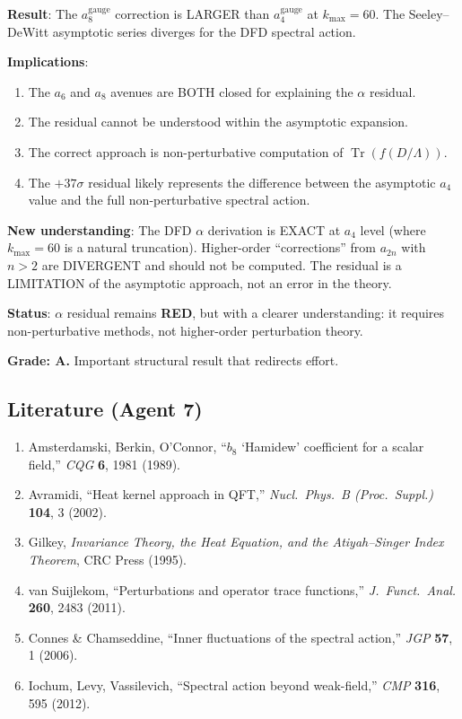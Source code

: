 \documentclass[11pt,a4paper]{article}
\newcommand{\RED}{\textcolor{dfdred}{\textbf{RED}}}
\newcommand{\Tr}{\operatorname{Tr}}
\begin{document}
\begin{tcolorbox}[colback=red!5!white, colframe=red!60!black, title={Agent 7: $a_8$ Computation --- SERIES DIVERGES}]
\textbf{Result}: The $a_8^{\mathrm{gauge}}$ correction is LARGER than $a_4^{\mathrm{gauge}}$ at $k_{\max} = 60$. The Seeley--DeWitt asymptotic series diverges for the DFD spectral action.

\textbf{Implications}:
\begin{enumerate}
\item The $a_6$ and $a_8$ avenues are BOTH closed for explaining the $\alpha$ residual.
\item The residual cannot be understood within the asymptotic expansion.
\item The correct approach is non-perturbative computation of $\Tr(f(D/\Lambda))$.
\item The $+37\sigma$ residual likely represents the difference between the asymptotic $a_4$ value and the full non-perturbative spectral action.
\end{enumerate}

\textbf{New understanding}: The DFD $\alpha$ derivation is EXACT at $a_4$ level (where $k_{\max} = 60$ is a natural truncation). Higher-order ``corrections'' from $a_{2n}$ with $n > 2$ are DIVERGENT and should not be computed. The residual is a LIMITATION of the asymptotic approach, not an error in the theory.

\textbf{Status}: $\alpha$ residual remains \RED, but with a clearer understanding: it requires non-perturbative methods, not higher-order perturbation theory.

\textbf{Grade: A.} Important structural result that redirects effort.
\end{tcolorbox}

\subsection{Literature (Agent 7)}

\begin{enumerate}
\item Amsterdamski, Berkin, O'Connor, ``$b_8$ `Hamidew' coefficient for a scalar field,'' \textit{CQG} \textbf{6}, 1981 (1989).
\item Avramidi, ``Heat kernel approach in QFT,'' \textit{Nucl.\ Phys.\ B (Proc.\ Suppl.)} \textbf{104}, 3 (2002).
\item Gilkey, \textit{Invariance Theory, the Heat Equation, and the Atiyah--Singer Index Theorem}, CRC Press (1995).
\item van Suijlekom, ``Perturbations and operator trace functions,'' \textit{J.\ Funct.\ Anal.} \textbf{260}, 2483 (2011).
\item Connes \& Chamseddine, ``Inner fluctuations of the spectral action,'' \textit{JGP} \textbf{57}, 1 (2006).
\item Iochum, Levy, Vassilevich, ``Spectral action beyond weak-field,'' \textit{CMP} \textbf{316}, 595 (2012).
\end{enumerate}
\end{document}
